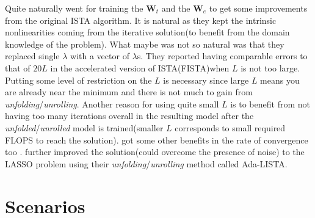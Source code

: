 Quite naturally \cite{Gregor2010} went for training the $\boldsymbol{W}_t$ and the $\boldsymbol{W}_e$ to get some improvements 
from the original \ac{ISTA}\cite{Daubechies2003} algorithm. It is natural as they kept the intrinsic 
nonlinearities coming from the iterative solution(to benefit from the domain knowledge of the problem). 
What maybe was not so natural was that they replaced single $\lambda$ with a vector of $\lambda$s. They reported having 
comparable errors to that of $20L$ in the accelerated  version of 
\ac{ISTA}\cite{Daubechies2003}(\ac{FISTA}\cite{Beck2009})when $L$ is not too 
large. Putting some level of restriction on the $L$ is necessary since large $L$ means you are already near the minimum 
and there is not much to gain from \emph{unfolding}/\emph{unrolling}. Another reason for using quite small $L$ is to benefit 
from not having too many iterations overall in the resulting model after the \emph{unfolded}/\emph{unrolled} model is 
trained(smaller $L$ corresponds to small required \ac{FLOPS}\cite{Hager2010}\cite{Hennessy2019} to reach the solution). 
\cite{Gregor2010} got some other benefits in the rate of convergence too 
\cite{Daubechies2003}\cite{Beck2009}\cite{Gregor2010}. \cite{Aberdam2020} further improved the solution(could overcome 
the presence of noise) to the \ac{LASSO}\cite{Hastie2009} problem using their 
\emph{unfolding}/\emph{unrolling} method called \ac{Ada-LISTA}.  


\section{Scenarios}


